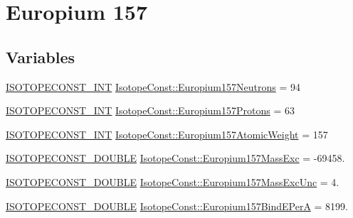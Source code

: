 \hypertarget{group___isotope_const-_europium-_eu157}{}\section{Europium 157}
\label{group___isotope_const-_europium-_eu157}
\subsection*{Variables}
\begin{DoxyCompactItemize}
\item 
\mbox{\hyperlink{group___isotope_const-_macros_ga5f18360b3e99483a35c32d789e62621c}{I\+S\+O\+T\+O\+P\+E\+C\+O\+N\+S\+T\+\_\+\+I\+NT}} \mbox{\hyperlink{group___isotope_const-_europium-_eu157_ga47122ff0ad3e1d6c781d23c8f9ce5c6a}{Isotope\+Const\+::\+Europium157\+Neutrons}} = 94
\item 
\mbox{\hyperlink{group___isotope_const-_macros_ga5f18360b3e99483a35c32d789e62621c}{I\+S\+O\+T\+O\+P\+E\+C\+O\+N\+S\+T\+\_\+\+I\+NT}} \mbox{\hyperlink{group___isotope_const-_europium-_eu157_gaf3c3a81b0761f142f0dbd9b5f89ee636}{Isotope\+Const\+::\+Europium157\+Protons}} = 63
\item 
\mbox{\hyperlink{group___isotope_const-_macros_ga5f18360b3e99483a35c32d789e62621c}{I\+S\+O\+T\+O\+P\+E\+C\+O\+N\+S\+T\+\_\+\+I\+NT}} \mbox{\hyperlink{group___isotope_const-_europium-_eu157_gae1608d486f69ae2bc51f45d092a9e472}{Isotope\+Const\+::\+Europium157\+Atomic\+Weight}} = 157
\item 
\mbox{\hyperlink{group___isotope_const-_macros_ga8f45a7272ce02c0b4c65c44636ed719a}{I\+S\+O\+T\+O\+P\+E\+C\+O\+N\+S\+T\+\_\+\+D\+O\+U\+B\+LE}} \mbox{\hyperlink{group___isotope_const-_europium-_eu157_gacafa174db416a77de5edc228518eea6d}{Isotope\+Const\+::\+Europium157\+Mass\+Exc}} = -\/69458.
\item 
\mbox{\hyperlink{group___isotope_const-_macros_ga8f45a7272ce02c0b4c65c44636ed719a}{I\+S\+O\+T\+O\+P\+E\+C\+O\+N\+S\+T\+\_\+\+D\+O\+U\+B\+LE}} \mbox{\hyperlink{group___isotope_const-_europium-_eu157_ga11fc37dc0ecc36bd04e46fb275dd86b6}{Isotope\+Const\+::\+Europium157\+Mass\+Exc\+Unc}} = 4.
\item 
\mbox{\hyperlink{group___isotope_const-_macros_ga8f45a7272ce02c0b4c65c44636ed719a}{I\+S\+O\+T\+O\+P\+E\+C\+O\+N\+S\+T\+\_\+\+D\+O\+U\+B\+LE}} \mbox{\hyperlink{group___isotope_const-_europium-_eu157_ga6a8805d9fc0d9a72b785c12125edfd7e}{Isotope\+Const\+::\+Europium157\+Bind\+E\+PerA}} = 8199.
\item 

\end{DoxyCompactItemize}
